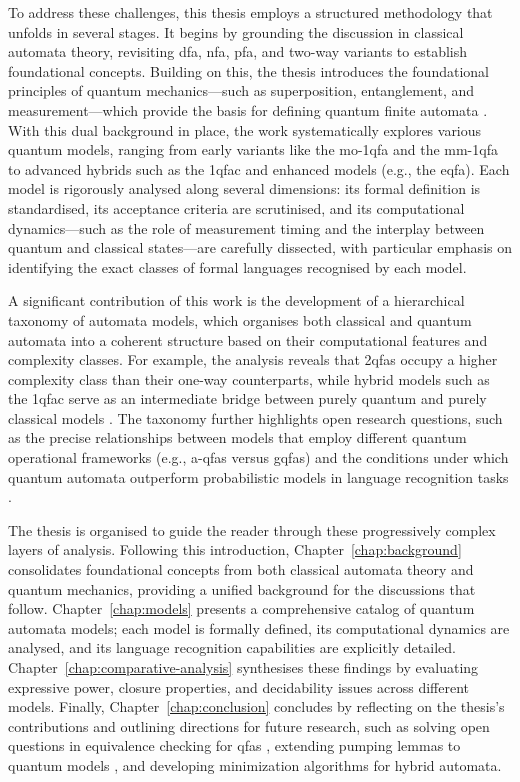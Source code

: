 To address these challenges, this thesis employs a structured methodology that unfolds in several stages. It begins by grounding the discussion in classical automata theory, revisiting \gls{dfa}, \gls{nfa}, \gls{pfa}, and two-way variants to establish foundational concepts. Building on this, the thesis introduces the foundational principles of quantum mechanics—such as superposition, entanglement, and measurement—which provide the basis for defining quantum finite automata \cite{nielsen2010quantum}. With this dual background in place, the work systematically explores various quantum models, ranging from early variants like the \gls{mo-1qfa} \cite{moore2000quantum} and the \gls{mm-1qfa} \cite{kondacs1997power} to advanced hybrids such as the \gls{1qfac} and enhanced models (e.g., the \gls{eqfa}). Each model is rigorously analysed along several dimensions: its formal definition is standardised, its acceptance criteria are scrutinised, and its computational dynamics—such as the role of measurement timing and the interplay between quantum and classical states—are carefully dissected, with particular emphasis on identifying the exact classes of formal languages recognised by each model.

A significant contribution of this work is the development of a hierarchical taxonomy of automata models, which organises both classical and quantum automata into a coherent structure based on their computational features and complexity classes. For example, the analysis reveals that \glspl{2qfa} occupy a higher complexity class than their one-way counterparts, while hybrid models such as the \gls{1qfac} serve as an intermediate bridge between purely quantum and purely classical models \cite{yakaryilmaz2010succinctness}. The taxonomy further highlights open research questions, such as the precise relationships between models that employ different quantum operational frameworks (e.g., \glspl{a-qfa} versus \glspl{gqfa}) and the conditions under which quantum automata outperform probabilistic models in language recognition tasks \cite{hirvensalo2012quantum}.

The thesis is organised to guide the reader through these progressively complex layers of analysis. Following this introduction, Chapter~\ref{chap:background} consolidates foundational concepts from both classical automata theory and quantum mechanics, providing a unified background for the discussions that follow. Chapter~\ref{chap:models} presents a comprehensive catalog of quantum automata models; each model is formally defined, its computational dynamics are analysed, and its language recognition capabilities are explicitly detailed. Chapter~\ref{chap:comparative-analysis} synthesises these findings by evaluating expressive power, closure properties, and decidability issues across different models. Finally, Chapter~\ref{chap:conclusion} concludes by reflecting on the thesis’s contributions and outlining directions for future research, such as solving open questions in equivalence checking for \glspl{qfa} \cite{li2012characterizations}, extending pumping lemmas to quantum models \cite{yakaryilmaz2014quantum}, and developing minimization algorithms for hybrid automata.

